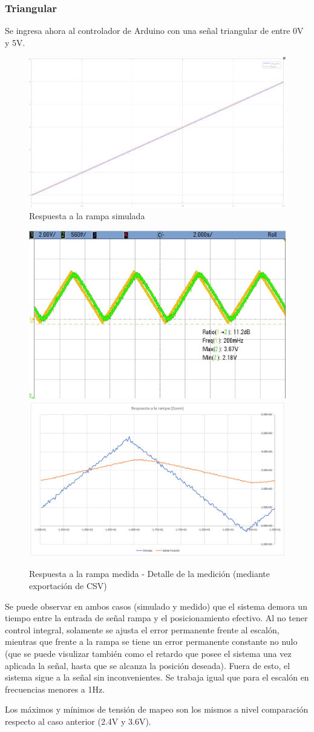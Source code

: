 \documentclass{article}
\begin{document}
\subsubsection{Triangular}

Se ingresa ahora al controlador de Arduino con una señal triangular de entre 0V y 5V.

\begin{figure}[H]
\centering
\includegraphics[width=0.7\linewidth]{../Images/RampaSimulado.png}
\caption{Respuesta a la rampa simulada}
\end{figure}

\begin{figure}[H]
\centering
\includegraphics[width=0.45\linewidth]{../Mediciones/servo_triangular.jpeg}
\includegraphics[width=0.45\linewidth]{../Images/RampaMedido.png}
\caption{Respuesta a la rampa medida - Detalle de la medición (mediante exportación de CSV)}
\end{figure}

Se puede observar en ambos casos (simulado y medido) que el sistema demora un tiempo entre la entrada de señal rampa y el posicionamiento efectivo. Al no tener control integral, solamente se ajusta el error permanente frente al escalón, mientras que frente a la rampa se tiene un error permanente constante no nulo (que se puede visulizar también como el retardo que posee el sistema una vez aplicada la señal, hasta que se alcanza la posición deseada). Fuera de esto, el sistema sigue a la señal sin inconvenientes. Se trabaja igual que para el escalón en frecuencias menores a 1Hz. \par
Los máximos y mínimos de tensión de mapeo son los mismos a nivel comparación respecto al caso anterior (2.4V y 3.6V).
\end{document}

